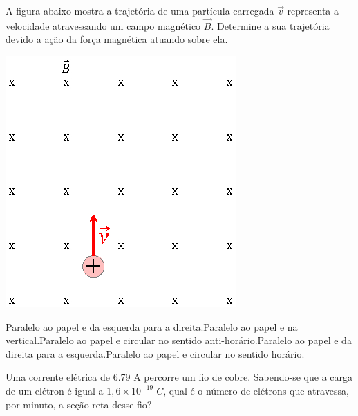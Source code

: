 \documentclass[12pt, addpoints]{exam}
\begin{document}
        \begin{questions}
\begin{multicols*}{2}
\question[20] A ﬁgura abaixo mostra a trajetória de uma partícula carregada $\vec{v}$ representa a velocidade atravessando um campo magnético $\vec{B}$. Determine a sua trajetória devido a ação da força magnética atuando sobre ela.

\begin{center}
\begin{minipage}[c]{0.50\linewidth}
\includegraphics[width=\textwidth]{CEMAG001.jpg}
\end{minipage}
\end{center}
\begin{choices}
\choice Paralelo ao papel e da esquerda para a direita.\choice Paralelo ao papel e na vertical.\choice Paralelo ao papel e circular no sentido anti-horário.\choice Paralelo ao papel e da direita para a esquerda.\choice Paralelo ao papel e circular no sentido horário.\end{choices}
\question[20] Uma corrente elétrica de    6.79 A percorre um ﬁo de cobre. Sabendo-se que a carga de um elétron é igual a $1,6\times 10^{-19}\;C$, qual é o número de elétrons que atravessa, por minuto, a seção reta desse ﬁo?


\end{multicols*}
\end{questions}
\end{document}
